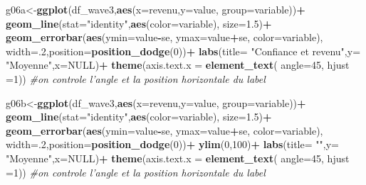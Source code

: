 \documentclass[
]{book}
\newenvironment{Shaded}{\begin{snugshade}}{\end{snugshade}}
\newcommand{\CommentTok}[1]{\textcolor[rgb]{0.56,0.35,0.01}{\textit{#1}}}
\newcommand{\DataTypeTok}[1]{\textcolor[rgb]{0.13,0.29,0.53}{#1}}
\newcommand{\DecValTok}[1]{\textcolor[rgb]{0.00,0.00,0.81}{#1}}
\newcommand{\FloatTok}[1]{\textcolor[rgb]{0.00,0.00,0.81}{#1}}
\newcommand{\KeywordTok}[1]{\textcolor[rgb]{0.13,0.29,0.53}{\textbf{#1}}}
\newcommand{\NormalTok}[1]{#1}
\newcommand{\OperatorTok}[1]{\textcolor[rgb]{0.81,0.36,0.00}{\textbf{#1}}}
\newcommand{\OtherTok}[1]{\textcolor[rgb]{0.56,0.35,0.01}{#1}}
\newcommand{\StringTok}[1]{\textcolor[rgb]{0.31,0.60,0.02}{#1}}
\begin{document}
\begin{Shaded}
\begin{Highlighting}[]
{{{{{{{{\NormalTok{g06a<-}\KeywordTok{ggplot}\NormalTok{(df_wave3,}\KeywordTok{aes}\NormalTok{(}\DataTypeTok{x=}\NormalTok{revenu,}\DataTypeTok{y=}\NormalTok{value, }\DataTypeTok{group=}\NormalTok{variable))}\OperatorTok{+}
\StringTok{  }\KeywordTok{geom_line}\NormalTok{(}\DataTypeTok{stat=}\StringTok{"identity"}\NormalTok{,}\KeywordTok{aes}\NormalTok{(}\DataTypeTok{color=}\NormalTok{variable), }\DataTypeTok{size=}\FloatTok{1.5}\NormalTok{)}\OperatorTok{+}\StringTok{ }
\StringTok{  }\KeywordTok{geom_errorbar}\NormalTok{(}\KeywordTok{aes}\NormalTok{(}\DataTypeTok{ymin=}\NormalTok{value}\OperatorTok{-}\NormalTok{se, }\DataTypeTok{ymax=}\NormalTok{value}\OperatorTok{+}\NormalTok{se, }\DataTypeTok{color=}\NormalTok{variable), }\DataTypeTok{width=}\NormalTok{.}\DecValTok{2}\NormalTok{,}\DataTypeTok{position=}\KeywordTok{position_dodge}\NormalTok{(}\DecValTok{0}\NormalTok{))}\OperatorTok{+}
\StringTok{  }\KeywordTok{labs}\NormalTok{(}\DataTypeTok{title=} \StringTok{"Confiance et revenu"}\NormalTok{,}\DataTypeTok{y=} \StringTok{"Moyenne"}\NormalTok{,}\DataTypeTok{x=}\OtherTok{NULL}\NormalTok{)}\OperatorTok{+}
\StringTok{  }\KeywordTok{theme}\NormalTok{(}\DataTypeTok{axis.text.x =} \KeywordTok{element_text}\NormalTok{( }\DataTypeTok{angle=}\DecValTok{45}\NormalTok{, }\DataTypeTok{hjust =}\DecValTok{1}\NormalTok{)) }\CommentTok{#on controle l'angle et la position horizontale du label}

  
\NormalTok{g06b<-}\KeywordTok{ggplot}\NormalTok{(df_wave3,}\KeywordTok{aes}\NormalTok{(}\DataTypeTok{x=}\NormalTok{revenu,}\DataTypeTok{y=}\NormalTok{value, }\DataTypeTok{group=}\NormalTok{variable))}\OperatorTok{+}
\StringTok{  }\KeywordTok{geom_line}\NormalTok{(}\DataTypeTok{stat=}\StringTok{"identity"}\NormalTok{,}\KeywordTok{aes}\NormalTok{(}\DataTypeTok{color=}\NormalTok{variable), }\DataTypeTok{size=}\FloatTok{1.5}\NormalTok{)}\OperatorTok{+}\StringTok{ }
\StringTok{  }\KeywordTok{geom_errorbar}\NormalTok{(}\KeywordTok{aes}\NormalTok{(}\DataTypeTok{ymin=}\NormalTok{value}\OperatorTok{-}\NormalTok{se, }\DataTypeTok{ymax=}\NormalTok{value}\OperatorTok{+}\NormalTok{se, }\DataTypeTok{color=}\NormalTok{variable), }\DataTypeTok{width=}\NormalTok{.}\DecValTok{2}\NormalTok{,}\DataTypeTok{position=}\KeywordTok{position_dodge}\NormalTok{(}\DecValTok{0}\NormalTok{))}\OperatorTok{+}
\StringTok{  }\KeywordTok{ylim}\NormalTok{(}\DecValTok{0}\NormalTok{,}\DecValTok{100}\NormalTok{)}\OperatorTok{+}
\StringTok{  }\KeywordTok{labs}\NormalTok{(}\DataTypeTok{title=} \StringTok{""}\NormalTok{,}\DataTypeTok{y=} \StringTok{"Moyenne"}\NormalTok{,}\DataTypeTok{x=}\OtherTok{NULL}\NormalTok{)}\OperatorTok{+}
\StringTok{  }\KeywordTok{theme}\NormalTok{(}\DataTypeTok{axis.text.x =} \KeywordTok{element_text}\NormalTok{( }\DataTypeTok{angle=}\DecValTok{45}\NormalTok{, }\DataTypeTok{hjust =}\DecValTok{1}\NormalTok{)) }\CommentTok{#on controle l'angle et la position horizontale du label}

}}}}}}}}
\end{Highlighting}
\end{Shaded}
\end{document}
